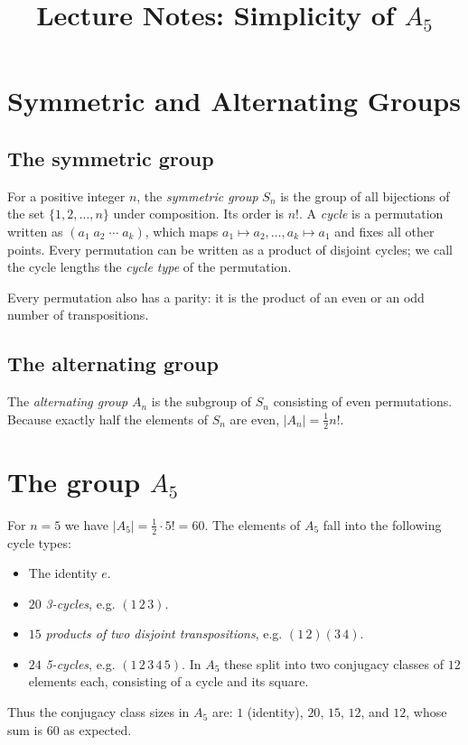 \documentclass{article}
\begin{document}
\title{Lecture Notes: Simplicity of $A_5$}
\author{}
\date{}
\maketitle

\section{Symmetric and Alternating Groups}
\subsection{The symmetric group}
For a positive integer $n$, the \emph{symmetric group} $S_n$ is the group of all bijections of the set $\{1,2,\ldots,n\}$ under composition.  Its order is $n!$.
A \emph{cycle} is a permutation written as $(a_1\;a_2\;\dotsb\;a_k)$, which maps $a_1\mapsto a_2,\ldots,a_k\mapsto a_1$ and fixes all other points.
Every permutation can be written as a product of disjoint cycles; we call the cycle lengths the \emph{cycle type} of the permutation.

Every permutation also has a parity: it is the product of an even or an odd number of transpositions.

\subsection{The alternating group}
The \emph{alternating group} $A_n$ is the subgroup of $S_n$ consisting of even permutations.  Because exactly half the elements of $S_n$ are even, $|A_n|=\tfrac{1}{2}n!$.

\section{The group $A_5$}
For $n=5$ we have $|A_5| = \tfrac{1}{2}\cdot5! = 60$.  The elements of $A_5$ fall into the following cycle types:
\begin{itemize}
 \item The identity $e$.
 \item $20$ \emph{3-cycles}, e.g. $(1\,2\,3)$.
 \item $15$ \emph{products of two disjoint transpositions}, e.g. $(1\,2)(3\,4)$.
 \item $24$ \emph{5-cycles}, e.g. $(1\,2\,3\,4\,5)$.  In $A_5$ these split into two conjugacy classes of $12$ elements each, consisting of a cycle and its square.
\end{itemize}
Thus the conjugacy class sizes in $A_5$ are: $1$ (identity), $20$, $15$, $12$, and $12$, whose sum is $60$ as expected.
\end{document}
